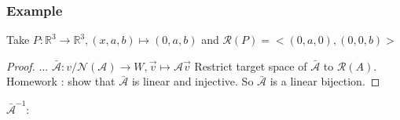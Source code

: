 \subsubsection{Example}
Take $P: \mathbb{R}^3 \to \mathbb{R}^3, (x,a,b) \mapsto (0,a,b)$ and $\mathcal{R}(P) = <(0,a,0),(0,0,b)>$

\begin{proof}
    ... $\bar{\mathcal{A}}: v/\mathcal{N}(\mathcal{A}) \to W, \vec{v} \mapsto \mathcal{A}\vec{v}$
    Restrict target space of $\bar{\mathcal{A}}$ to $\mathcal{R}(A)$. Homework : show that $\bar{\mathcal{A}}$ is linear and injective.
    So $\bar{\mathcal{A}}$ is a linear bijection.
\end{proof}

$\bar{\mathcal{A}}^{-1}:$

